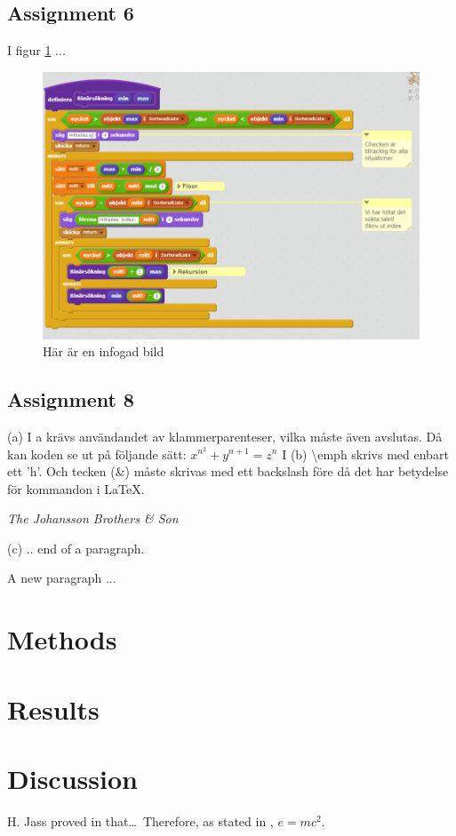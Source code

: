 \documentclass[a4paper,12pt]{article}
\begin{document}
\subsection{Assignment 6}
I figur \ref{f:bild} ...
\begin{figure}[htbp]
	\centering
	\includegraphics[scale=0.65]{img/binaryimpl}
	\caption{Här är en infogad bild}
	\label{f:bild}
\end{figure}
\subsection{Assignment 8}
(a) I a krävs användandet av klammerparenteser, vilka måste även avslutas. Då kan koden se ut på följande sätt:
 $x^{n^2} + y^{n + 1} = z^n $ I
(b) \textbackslash emph skrivs med enbart ett 'h'. Och tecken (\&) måste skrivas med ett backslash före då det har betydelse för kommandon i \LaTeX . 
\begin{center}
	\emph{The Johansson Brothers \& Son}
\end{center}
(c) .. end of a paragraph. 

A new paragraph ... 
\section{Methods}
\section{Results}
\section{Discussion}
H. Jass proved in \cite{big} that\ldots \ Therefore, as stated in \cite{Creswell2014}, $e = m c^2$.



\end{document}
